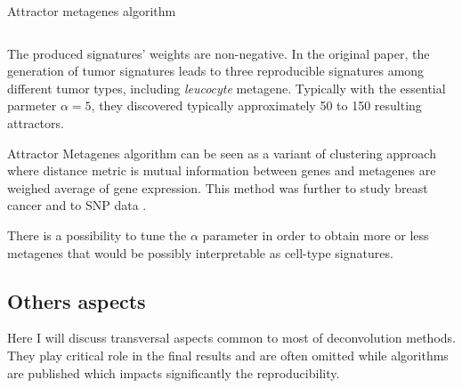 \documentclass[12pt,]{book}
\theoremstyle{definition}
\theoremstyle{definition}
\theoremstyle{definition}
\theoremstyle{remark}
\begin{document}
\begin{algorithm}
\caption{Attractor metagenes algorithm}
\begin{algorithmic}[2]
\begin{equation}\label{eq:attr}\end{equation}
  
 
 
 \Repeat
{}
\end{algorithmic}
\end{algorithm}

The produced signatures' weights are non-negative. In the original
paper, the generation of tumor signatures leads to three reproducible
signatures among different tumor types, including \emph{leucocyte}
metagene. Typically with the essential parmeter \(\alpha=5\), they
discovered typically approximately 50 to 150 resulting attractors.

Attractor Metagenes algorithm can be seen as a variant of clustering
approach where distance metric is mutual information between genes and
metagenes are weighed average of gene expression. This method was
further to study breast cancer \citep{AlEjeh2014} and to SNP data
\citep{Elmas2016}.

There is a possibility to tune the \(\alpha\) parameter in order to
obtain more or less metagenes that would be possibly interpretable as
cell-type signatures.

\hypertarget{others-aspects}{%
\subsection{Others aspects}\label{others-aspects}}

Here I will discuss transversal aspects common to most of deconvolution
methods. They play critical role in the final results and are often
omitted while algorithms are published which impacts significantly the
reproducibility.
\end{document}
